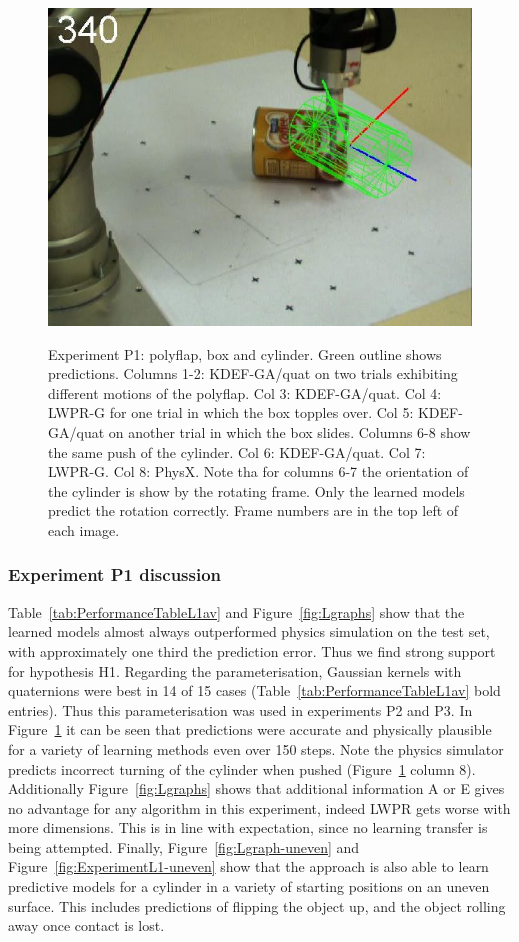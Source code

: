 \begin{figure}[htbp]
{\includegraphics[width=\imgAXwid]{./A3_physx_39_5}
}
\caption {Experiment P1: polyflap, box and cylinder. Green outline shows
  predictions. Columns 1-2: KDEF-GA/quat on two trials exhibiting
  different motions of the polyflap. Col 3: KDEF-GA/quat. Col 4: LWPR-G for one trial in
  which the box topples over. Col 5: KDEF-GA/quat on another trial in
  which the box slides. Columns 6-8 show the same push of the
  cylinder. Col 6: KDEF-GA/quat. Col 7: LWPR-G. Col 8: PhysX. Note tha
  for columns 6-7 the orientation of the cylinder is show by the
  rotating frame. Only the learned models predict the rotation
  correctly. Frame numbers are in the top left of each image. }
\label{fig:ExperimentL2}
\end{figure}
\subsubsection{Experiment P1 discussion} Table~\ref{tab:PerformanceTableL1av} and Figure~\ref{fig:Lgraphs} show that the learned models almost always outperformed physics simulation on the test set, with approximately one third the prediction error. Thus we find strong support for hypothesis H1. Regarding the parameterisation, Gaussian kernels with quaternions were best in 14 of 15 cases  (Table~\ref{tab:PerformanceTableL1av} bold entries). Thus this parameterisation was used in experiments P2 and P3.
In Figure~\ref{fig:ExperimentL2} it can be
seen that predictions were accurate and physically plausible for a
variety of learning methods even over 150 steps. Note the physics
simulator predicts incorrect turning of the cylinder when pushed
(Figure~\ref{fig:ExperimentL2} column 8). Additionally Figure~\ref{fig:Lgraphs} shows that additional information A or E gives no advantage for any algorithm in this experiment, indeed LWPR gets worse with more dimensions. This is in line with expectation, since no learning transfer is being attempted. Finally, Figure~\ref{fig:Lgraph-uneven} and Figure~\ref{fig:ExperimentL1-uneven} show that the approach is also able to learn predictive models for a cylinder in a variety of starting positions on an uneven surface. This includes predictions of flipping the object up, and the object rolling away once contact is lost.

